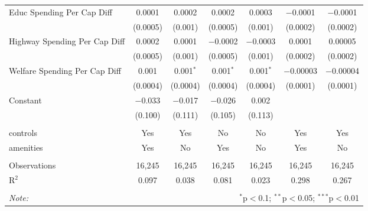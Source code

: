 \begin{table}[!htbp]
\begin{tabular}{@{\extracolsep{5pt}}lcccccc}
  Educ Spending Per Cap Diff & 0.0001 & 0.0002 & 0.0002 & 0.0003 & $-$0.0001 & $-$0.0001 \\ 
  & (0.0005) & (0.001) & (0.0005) & (0.001) & (0.0002) & (0.0002) \\ 
  Highway Spending Per Cap Diff & 0.0002 & 0.0001 & $-$0.0002 & $-$0.0003 & 0.0001 & 0.00005 \\ 
  & (0.0005) & (0.001) & (0.0005) & (0.001) & (0.0002) & (0.0002) \\ 
  Welfare Spending Per Cap Diff & 0.001 & 0.001$^{*}$ & 0.001$^{*}$ & 0.001$^{*}$ & $-$0.00003 & $-$0.00004 \\ 
  & (0.0004) & (0.0004) & (0.0004) & (0.0004) & (0.0001) & (0.0001) \\ 
  Constant & $-$0.033 & $-$0.017 & $-$0.026 & 0.002 &  &  \\ 
  & (0.100) & (0.111) & (0.105) & (0.113) &  &  \\ 
 \hline \\[-1.8ex] 
controls & Yes & Yes & No & No & Yes & Yes \\ 
amenities & Yes & No & Yes & No & Yes & No \\ 
\hline \\[-1.8ex] 
Observations & 16,245 & 16,245 & 16,245 & 16,245 & 16,245 & 16,245 \\ 
R$^{2}$ & 0.097 & 0.038 & 0.081 & 0.023 & 0.298 & 0.267 \\ 
\hline 
\hline \\[-1.8ex] 
\textit{Note:}  & \multicolumn{6}{r}{$^{*}$p$<$0.1; $^{**}$p$<$0.05; $^{***}$p$<$0.01} \\ 
\end{tabular} 
\end{table} 
